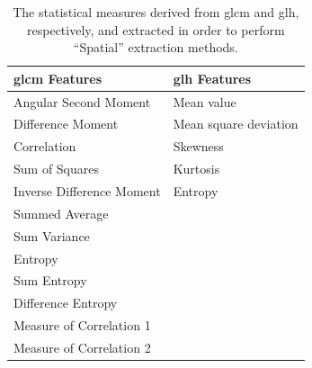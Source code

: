 \documentclass[journal,article,accept,moreauthors,pdftex, applsci]{Definitions/mdpi}
\begin{document}
\begin{table}[H]
    \centering
    \begin{tabular}{ll}
        \hline
        \textbf{\ac{glcm} Features}& \textbf{\ac{glh} Features}     \\ \hline
        Angular Second Moment      & Mean value                     \\
        Difference Moment          & Mean square deviation          \\
        Correlation                & Skewness                       \\
        Sum of Squares             & Kurtosis                       \\
        Inverse Difference Moment  & Entropy                        \\     
        Summed Average             &                                \\    
        Sum Variance               &                                \\    
        Entropy                    &                                \\    
        Sum Entropy                &                                \\    
        Difference Entropy         &                                \\    
        Measure of Correlation 1   &                                \\  
        Measure of Correlation 2   &                                \\ 
    \end{tabular}
    \caption{The statistical measures derived from \ac{glcm} and \ac{glh}, respectively, and extracted in order to perform “Spatial” extraction methods.}
    \label{tab:histogram_features}
\end{table}\par
\end{document}
